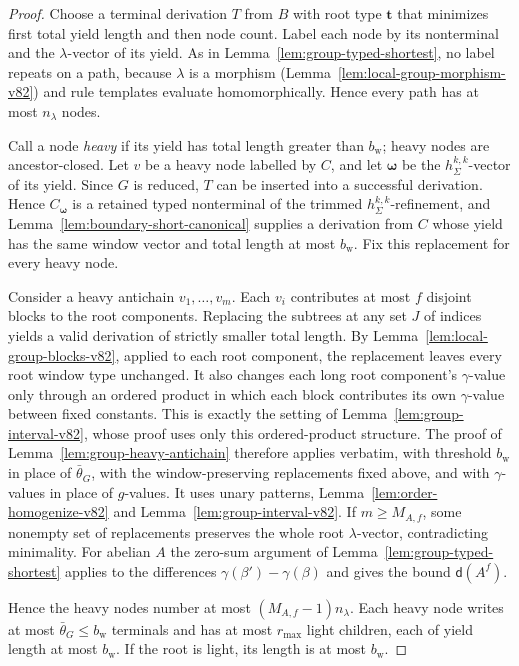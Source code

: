 \documentclass[11pt]{article}
\numberwithin{equation}{section}
\theoremstyle{plain}
\theoremstyle{definition}
\theoremstyle{remark}
\theoremstyle{plain}
\begin{document}
\begin{proof}
Choose a terminal derivation $T$ from $B$ with root type $\mathbf t$
that minimizes first total yield length and then node count.  Label
each node by its nonterminal and the $\lambda$-vector of its yield.  As
in Lemma~\ref{lem:group-typed-shortest}, no label repeats on a path,
because $\lambda$ is a morphism (Lemma~\ref{lem:local-group-morphism-v82})
and rule templates evaluate homomorphically.  Hence every path has at
most $n_\lambda$ nodes.

Call a node \emph{heavy} if its yield has total length greater than
$b_{\mathrm w}$; heavy nodes are ancestor-closed.  Let $v$ be a heavy
node labelled by $C$, and let $\boldsymbol\omega$ be the
$h^{k,k}_\Sigma$-vector of its yield.  Since $G$ is reduced, $T$ can
be inserted into a successful derivation.  Hence $C_{\boldsymbol\omega}$
is a retained typed nonterminal of the trimmed $h^{k,k}_\Sigma$-refinement,
and Lemma~\ref{lem:boundary-short-canonical} supplies a derivation from
$C$ whose yield has the same window vector and total length at most
$b_{\mathrm w}$.  Fix this replacement for every heavy node.

Consider a heavy antichain $v_1,\ldots,v_m$.  Each $v_i$ contributes at
most $f$ disjoint blocks to the root components.  Replacing the subtrees
at any set $J$ of indices yields a valid derivation of strictly smaller
total length.  By Lemma~\ref{lem:local-group-blocks-v82}, applied to each
root component, the replacement leaves every root window type unchanged.
It also changes each long root component's $\gamma$-value only through
an ordered product in which each block contributes its own
$\gamma$-value between fixed constants.  This is exactly the setting of
Lemma~\ref{lem:group-interval-v82}, whose proof uses only this
ordered-product structure.  The proof of
Lemma~\ref{lem:group-heavy-antichain} therefore applies verbatim, with
threshold $b_{\mathrm w}$ in place of $\bar\theta_G$, with the
window-preserving replacements fixed above, and with $\gamma$-values in
place of $g$-values.  It uses unary patterns,
Lemma~\ref{lem:order-homogenize-v82} and Lemma~\ref{lem:group-interval-v82}.  If $m\ge M_{A,f}$, some nonempty set
of replacements preserves the whole root $\lambda$-vector, contradicting
minimality.  For abelian $A$ the zero-sum argument of
Lemma~\ref{lem:group-typed-shortest} applies to the differences
$\gamma(\beta')-\gamma(\beta)$ and gives the bound $\mathsf d(A^f)$.

Hence the heavy nodes number at most $(M_{A,f}-1)n_\lambda$.  Each
heavy node writes at most $\bar\theta_G\le b_{\mathrm w}$ terminals and
has at most $r_{\max}$ light children, each of yield length at most
$b_{\mathrm w}$.  If the root is light, its length is at most
$b_{\mathrm w}$.
\end{proof}
\end{document}
